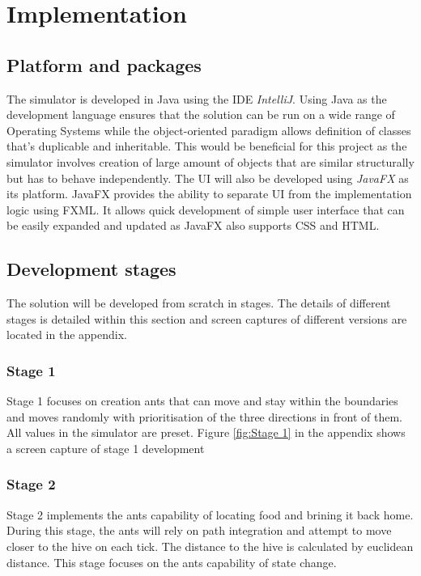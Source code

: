 \documentclass[a4paper, oneside, 11pt]{report}
\begin{document}
\chapter{Implementation}
\label{chap:Implementation}
\section{Platform and packages}
The simulator is developed in Java using the IDE \textit{IntelliJ}. Using Java as the development language ensures that the solution can be run on a wide range of Operating Systems while the object-oriented paradigm allows definition of classes that's duplicable and inheritable. This would be beneficial for this project as the simulator involves creation of large amount of objects that are similar structurally but has to behave independently. The UI will also be developed using \textit{JavaFX} as its platform. JavaFX provides the ability to separate UI from the implementation logic using FXML. It allows quick development of simple user interface that can be easily expanded and updated as JavaFX also supports CSS and HTML.

\section{Development stages}
The solution will be developed from scratch in stages. The details of different stages is detailed within this section and screen captures of different versions are located in the appendix.

\subsection{Stage 1}
Stage 1 focuses on creation ants that can move and stay within the boundaries and moves randomly with prioritisation of the three directions in front of them. All values in the simulator are preset. Figure \ref{fig:Stage 1} in the appendix shows a screen capture of stage 1 development

\subsection{Stage 2}
Stage 2 implements the ants capability of locating food and brining it back home. During this stage, the ants will rely on path integration and attempt to move closer to the hive on each tick. The distance to the hive is calculated by euclidean distance. This stage focuses on the ants capability of state change.
\end{document}
